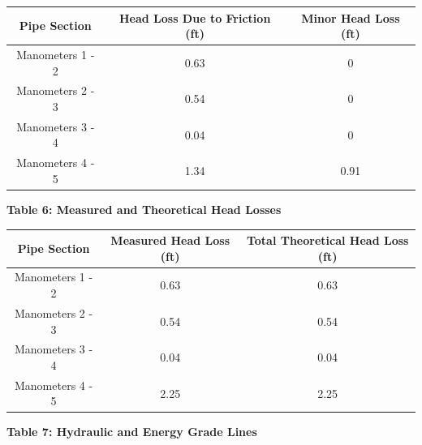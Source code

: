 \documentclass{article}
\begin{document}
\begin{center}
    \begin{tabular}{|ccc|} 
        \hline
        \textbf{Pipe Section} & \textbf{Head Loss Due to Friction (ft)} & \textbf{Minor Head Loss (ft)}  \\ 
        \hline
        Manometers 1 - 2      & 0.63                                    & 0                              \\
        Manometers 2 - 3      & 0.54                                    & 0                              \\
        Manometers 3 - 4      & 0.04                                    & 0                              \\
        Manometers 4 - 5      & 1.34                                    & 0.91                           \\
        \hline
    \end{tabular}

    \vspace{10mm}
    {\large{\bf Table 6: Measured and Theoretical Head Losses\\}}
    \vspace{3mm}

    \begin{tabular}{|ccc|} 
        \hline
        \textbf{Pipe Section} & \textbf{Measured Head Loss (ft)} & \textbf{Total Theoretical Head Loss (ft)}  \\ 
        \hline
        Manometers 1 - 2      & 0.63                             & 0.63                                       \\
        Manometers 2 - 3      & 0.54                             & 0.54                                       \\
        Manometers 3 - 4      & 0.04                             & 0.04                                       \\
        Manometers 4 - 5      & 2.25                             & 2.25                                       \\
        \hline
    \end{tabular}

    \vspace{10mm}
    {\large{\bf Table 7: Hydraulic and Energy Grade Lines\\}}
    \vspace{3mm}


\end{center}
\end{document}
